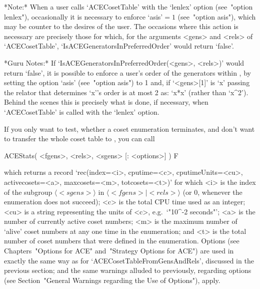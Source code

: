 *Note:* 
When  a  user  calls  `ACECosetTable'   with   the   `lenlex'   option
(see~"option  lenlex"),  occasionally  it  is  necessary  to   enforce
`asis'${}=1$ (see~"option asis"), which may be counter to the  desires
of the  user.  The  occasions  where  this  action  is  necessary  are
precisely those for which, for the  arguments  <gens>  and  <rels>  of
`ACECosetTable',   `IsACEGeneratorsInPreferredOrder'   would    return
`false'.

*Guru Notes:*
If  `IsACEGeneratorsInPreferredOrder(<gens>,  <rels>)'  would   return
`false', it is possible to enforce a user's order  of  the  generators
within {\ACE}, by setting the option `asis' (see~"option asis")  to  1
and, if `<gens>[1]' is `x' passing the relator that  determines  `x''s
order is at most 2 as: `x*x' (rather than `x^2').  Behind  the  scenes
this is precisely what is done, if necessary, when `ACECosetTable'  is
called with the `lenlex' option.

\enditems


\beginitems

If you only want to  test, whether a coset enumeration terminates, and
don't want to  transfer the whole coset table  to {\GAP}, you can call

\>ACEStats( <fgens>, <rels>, <sgens> [: <options>] ) F
\label{ACEStatsNI}

which returns a record `rec(index=<i>, cputime=<c>, cputimeUnits=<cu>,
activecosets=<a>, maxcosets=<m>, totcosets=<t>)' for which <i> is  the
index of the subgroup $\langle <sgens> \rangle$  in  $\langle  <fgens>
\mid <rels> \rangle$  (or  $0$,  whenever  the  enumeration  does  not
succeed); <c> is the total CPU time used as  an  integer;  <cu>  is  a
string representing the units of <c>, e.g.~`"10^-2 seconds"';  <a>  is
the number of currently active  coset  numbers;  <m>  is  the  maximum
number  of  \lq{}alive'  coset  numbers  at  any  one  time   in   the
enumeration; and <t> is the total number of coset  numbers  that  were
defined in the enumeration. Options (see  Chapters~"Options  for  ACE"
and~"Strategy Options for ACE") are used in exactly the  same  way  as
for `ACECosetTableFromGensAndRels', discussed in the previous section;
and the same warnings alluded to previously,  regarding  options  (see
Section~"General Warnings regarding the Use of Options"), apply.

